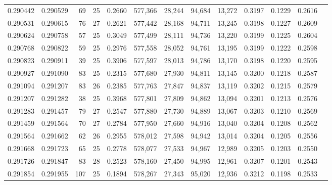 \begin{tabular}{rrrrrrrrrrrrr}
0.290442 & 0.290529 &  69 &  25 &                                     0.2660 & 577,366 &  28,244 &  94,684 &  13,272 & 0.3197 & 0.1229 & 0.2616 \\
0.290531 & 0.290615 &  76 &  27 &                                     0.2621 & 577,442 &  28,168 &  94,711 &  13,245 & 0.3198 & 0.1227 & 0.2609 \\
0.290624 & 0.290758 &  57 &  25 &                                     0.3049 & 577,499 &  28,111 &  94,736 &  13,220 & 0.3199 & 0.1225 & 0.2604 \\
0.290768 & 0.290822 &  59 &  25 &                                     0.2976 & 577,558 &  28,052 &  94,761 &  13,195 & 0.3199 & 0.1222 & 0.2598 \\
0.290823 & 0.290911 &  39 &  25 &                                     0.3906 & 577,597 &  28,013 &  94,786 &  13,170 & 0.3198 & 0.1220 & 0.2595 \\
0.290927 & 0.291090 &  83 &  25 &                                     0.2315 & 577,680 &  27,930 &  94,811 &  13,145 & 0.3200 & 0.1218 & 0.2587 \\
0.291094 & 0.291207 &  83 &  26 &                                     0.2385 & 577,763 &  27,847 &  94,837 &  13,119 & 0.3202 & 0.1215 & 0.2579 \\
0.291207 & 0.291282 &  38 &  25 &                                     0.3968 & 577,801 &  27,809 &  94,862 &  13,094 & 0.3201 & 0.1213 & 0.2576 \\
0.291283 & 0.291457 &  79 &  27 &                                     0.2547 & 577,880 &  27,730 &  94,889 &  13,067 & 0.3203 & 0.1210 & 0.2569 \\
0.291459 & 0.291564 &  70 &  27 &                                     0.2784 & 577,950 &  27,660 &  94,916 &  13,040 & 0.3204 & 0.1208 & 0.2562 \\
0.291564 & 0.291662 &  62 &  26 &                                     0.2955 & 578,012 &  27,598 &  94,942 &  13,014 & 0.3204 & 0.1205 & 0.2556 \\
0.291668 & 0.291723 &  65 &  25 &                                     0.2778 & 578,077 &  27,533 &  94,967 &  12,989 & 0.3205 & 0.1203 & 0.2550 \\
0.291726 & 0.291847 &  83 &  28 &                                     0.2523 & 578,160 &  27,450 &  94,995 &  12,961 & 0.3207 & 0.1201 & 0.2543 \\
0.291854 & 0.291955 & 107 &  25 &                                     0.1894 & 578,267 &  27,343 &  95,020 &  12,936 & 0.3212 & 0.1198 & 0.2533 \\

\end{tabular}

